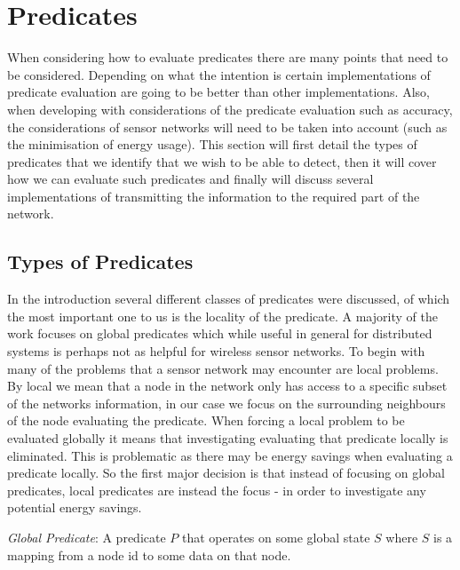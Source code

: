 
\section{Predicates}

When considering how to evaluate predicates there are many points that need to be considered. Depending on what the intention is certain implementations of predicate evaluation are going to be better than other implementations. Also, when developing with considerations of the predicate evaluation such as accuracy, the considerations of sensor networks will need to be taken into account (such as the minimisation of energy usage). This section will first detail the types of predicates that we identify that we wish to be able to detect, then it will cover how we can evaluate such predicates and finally will discuss several implementations of transmitting the information to the required part of the network.

\subsection{Types of Predicates}

In the introduction several different classes of predicates were discussed, of which the most important one to us is the locality of the predicate. A majority of the work focuses on global predicates \cite{277788,345831,553309} which while useful in general for distributed systems is perhaps not as helpful for wireless sensor networks. To begin with many of the problems that a sensor network may encounter are local problems. By local we mean that a node in the network only has access to a specific subset of the networks information, in our case we focus on the surrounding neighbours of the node evaluating the predicate. When forcing a local problem to be evaluated globally it means that investigating evaluating that predicate locally is eliminated. This is problematic as there may be energy savings when evaluating a predicate locally. So the first major decision is that instead of focusing on global predicates, local predicates are instead the focus - in order to investigate any potential energy savings.

\begin{mydef}
\emph{Global Predicate}: A predicate $P$ that operates on some global state $S$ where $S$ is a mapping from a node id to some data on that node.
\end{mydef}

